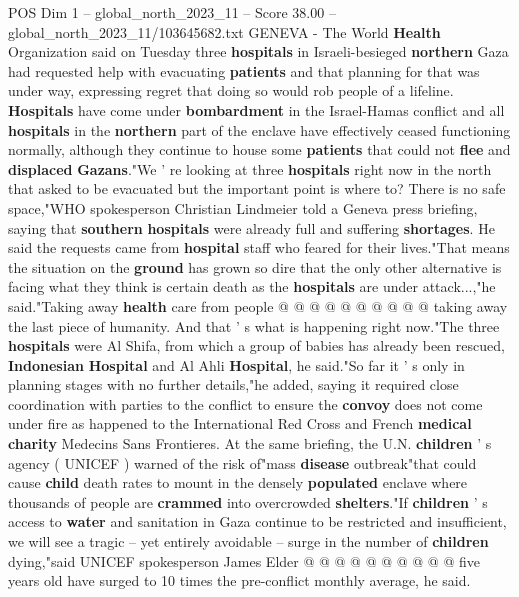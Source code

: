 \begin{textsample}{POS Dim 1 – global\_north\_2023\_11 – Score 38.00 – global\_north\_2023\_11/103645682.txt}  \label{ex:f1_pos_259}
GENEVA - The World \textbf{Health} Organization said on Tuesday three \textbf{hospitals} in Israeli-besieged \textbf{northern} Gaza had requested help with evacuating \textbf{patients} and that planning for that was under way, expressing regret that doing so would rob people of a lifeline. \textbf{Hospitals} have come under \textbf{bombardment} in the Israel-Hamas conflict and all \textbf{hospitals} in the \textbf{northern} part of the enclave have effectively ceased functioning normally, although they continue to house some \textbf{patients} that could not \textbf{flee} and \textbf{displaced} \textbf{Gazans}."We ' re looking at three \textbf{hospitals} right now in the north that asked to be evacuated but the important point is where to?
There is no safe space,"WHO spokesperson Christian Lindmeier told a Geneva press briefing, saying that \textbf{southern} \textbf{hospitals} were already full and suffering \textbf{shortages}.
He said the requests came from \textbf{hospital} staff who feared for their lives."That means the situation on the \textbf{ground} has grown so dire that the only other alternative is facing what they think is certain death as the \textbf{hospitals} are under attack...,"he said."Taking away \textbf{health} care from people @ @ @ @ @ @ @ @ @ @ taking away the last piece of humanity.
And that ' s what is happening right now."The three \textbf{hospitals} were Al Shifa, from which a group of babies has already been rescued, \textbf{Indonesian} \textbf{Hospital} and Al Ahli \textbf{Hospital}, he said."So far it ' s only in planning stages with no further details,"he added, saying it required close coordination with parties to the conflict to ensure the \textbf{convoy} does not come under fire as happened to the International Red Cross and French \textbf{medical} \textbf{charity} Medecins Sans Frontieres.
At the same briefing, the U.N. \textbf{children} ' s agency ( UNICEF ) warned of the risk of"mass \textbf{disease} outbreak"that could cause \textbf{child} death rates to mount in the densely \textbf{populated} enclave where thousands of people are \textbf{crammed} into overcrowded \textbf{shelters}."If \textbf{children} ' s access to \textbf{water} and sanitation in Gaza continue to be restricted and insufficient, we will see a tragic -- yet entirely avoidable -- surge in the number of \textbf{children} dying,"said UNICEF spokesperson James Elder @ @ @ @ @ @ @ @ @ @ five years old have surged to 10 times the pre-conflict monthly average, he said.

\end{textsample}
